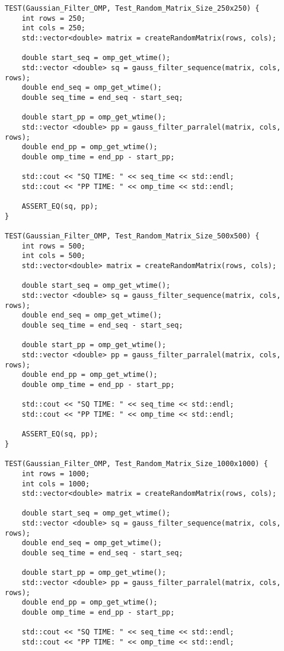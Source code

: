 \documentclass{report}
\begin{document}
\begin{lstlisting}
TEST(Gaussian_Filter_OMP, Test_Random_Matrix_Size_250x250) {
    int rows = 250;
    int cols = 250;
    std::vector<double> matrix = createRandomMatrix(rows, cols);

    double start_seq = omp_get_wtime();
    std::vector <double> sq = gauss_filter_sequence(matrix, cols, rows);
    double end_seq = omp_get_wtime();
    double seq_time = end_seq - start_seq;

    double start_pp = omp_get_wtime();
    std::vector <double> pp = gauss_filter_parralel(matrix, cols, rows);
    double end_pp = omp_get_wtime();
    double omp_time = end_pp - start_pp;

    std::cout << "SQ TIME: " << seq_time << std::endl;
    std::cout << "PP TIME: " << omp_time << std::endl;

    ASSERT_EQ(sq, pp);
}

TEST(Gaussian_Filter_OMP, Test_Random_Matrix_Size_500x500) {
    int rows = 500;
    int cols = 500;
    std::vector<double> matrix = createRandomMatrix(rows, cols);

    double start_seq = omp_get_wtime();
    std::vector <double> sq = gauss_filter_sequence(matrix, cols, rows);
    double end_seq = omp_get_wtime();
    double seq_time = end_seq - start_seq;

    double start_pp = omp_get_wtime();
    std::vector <double> pp = gauss_filter_parralel(matrix, cols, rows);
    double end_pp = omp_get_wtime();
    double omp_time = end_pp - start_pp;

    std::cout << "SQ TIME: " << seq_time << std::endl;
    std::cout << "PP TIME: " << omp_time << std::endl;

    ASSERT_EQ(sq, pp);
}

TEST(Gaussian_Filter_OMP, Test_Random_Matrix_Size_1000x1000) {
    int rows = 1000;
    int cols = 1000;
    std::vector<double> matrix = createRandomMatrix(rows, cols);

    double start_seq = omp_get_wtime();
    std::vector <double> sq = gauss_filter_sequence(matrix, cols, rows);
    double end_seq = omp_get_wtime();
    double seq_time = end_seq - start_seq;

    double start_pp = omp_get_wtime();
    std::vector <double> pp = gauss_filter_parralel(matrix, cols, rows);
    double end_pp = omp_get_wtime();
    double omp_time = end_pp - start_pp;

    std::cout << "SQ TIME: " << seq_time << std::endl;
    std::cout << "PP TIME: " << omp_time << std::endl;


\end{lstlisting}
\end{document}
